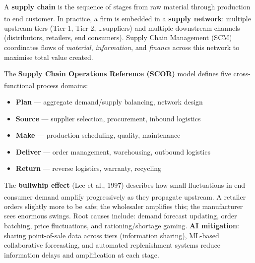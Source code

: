 \begin{tcbitemize}[ skin=sectionraster ]

    \tcbitem[title=Supply Chain vs.\ Supply Network, raster multicolumn=3]
    A \textbf{supply chain} is the sequence of stages from raw material through production to end customer\textsuperscript{\cite[][pp.~1--4]{chopraSupplyChainManagement2019}}.
    In practice, a firm is embedded in a \textbf{supply network}: multiple upstream tiers (Tier-1, Tier-2, \ldots suppliers) and multiple downstream channels (distributors, retailers, end consumers).
    Supply Chain Management (SCM) coordinates flows of \emph{material}, \emph{information}, and \emph{finance} across this network to maximise total value created.

    \tcbitem[title=SCOR Reference Model, raster multicolumn=3]
    The \textbf{Supply Chain Operations Reference (SCOR)} model defines five cross-functional process domains\textsuperscript{\cite[][pp.~5--6]{chopraSupplyChainManagement2019}}:
    \begin{itemize}
        \item \textbf{Plan} --- aggregate demand/supply balancing, network design
        \item \textbf{Source} --- supplier selection, procurement, inbound logistics
        \item \textbf{Make} --- production scheduling, quality, maintenance
        \item \textbf{Deliver} --- order management, warehousing, outbound logistics
        \item \textbf{Return} --- reverse logistics, warranty, recycling
    \end{itemize}

    \tcbitem[title=The Bullwhip Effect, raster multicolumn=6]
    The \textbf{bullwhip effect} (Lee et al., 1997) describes how small fluctuations in end-consumer demand amplify progressively as they propagate upstream\textsuperscript{\cite[][pp.~490--493]{chopraSupplyChainManagement2019}}.
    A retailer orders slightly more to be safe; the wholesaler amplifies this; the manufacturer sees enormous swings.
    Root causes include: demand forecast updating, order batching, price fluctuations, and rationing/shortage gaming.
    \tcblower
    \textbf{AI mitigation}: sharing point-of-sale data across tiers (information sharing), ML-based collaborative forecasting, and automated replenishment systems reduce information delays and amplification at each stage.

\end{tcbitemize}


